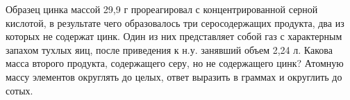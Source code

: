 
Образец цинка массой 29,9 г прореагировал с концентрированной серной кислотой, в результате чего
образовалось три серосодержащих продукта, два из которых не содержат цинк. Один
из них представляет собой газ с характерным запахом тухлых яиц, после
приведения к н.у. занявший объем 2,24 л. Какова масса второго продукта,
содержащего серу, но не содержащего цинк? Атомную массу элементов округлять до
целых, ответ выразить в граммах и округлить до сотых.



